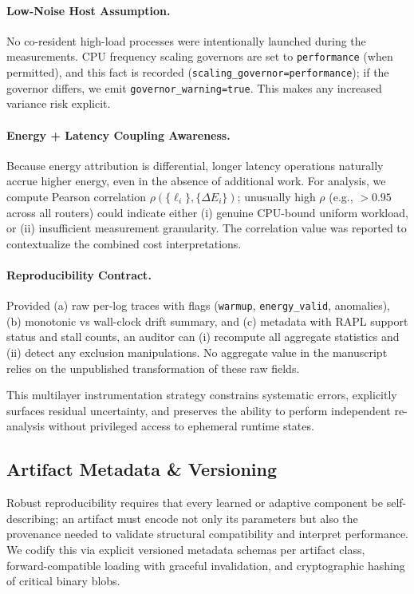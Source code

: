 \paragraph{Low-Noise Host Assumption.} No co-resident high-load processes were intentionally launched during the measurements. CPU frequency scaling governors are set to \texttt{performance} (when permitted), and this fact is recorded (\texttt{scaling\_governor=performance}); if the governor differs, we emit \texttt{governor\_warning=true}. This makes any increased variance risk explicit.

\paragraph{Energy + Latency Coupling Awareness.} Because energy attribution is differential, longer latency operations naturally accrue higher energy, even in the absence of additional work. For analysis, we compute Pearson correlation $\rho(\{\ell_i\}, \{\Delta E_i\})$; unusually high $\rho$ (e.g., $>0.95$ across all routers) could indicate either (i) genuine CPU-bound uniform workload, or (ii) insufficient measurement granularity. The correlation value was reported to contextualize the combined cost interpretations.

\paragraph{Reproducibility Contract.} Provided (a) raw per-log traces with flags (\texttt{warmup}, \texttt{energy\_valid}, anomalies), (b) monotonic vs wall-clock drift summary, and (c) metadata with RAPL support status and stall counts, an auditor can (i) recompute all aggregate statistics and (ii) detect any exclusion manipulations. No aggregate value in the manuscript relies on the unpublished transformation of these raw fields.

This multilayer instrumentation strategy constrains systematic errors, explicitly surfaces residual uncertainty, and preserves the ability to perform independent re-analysis without privileged access to ephemeral runtime states.
\subsection{Artifact Metadata \& Versioning}
\label{subsec:artifact_metadata_versioning}
Robust reproducibility requires that every learned or adaptive component be self-describing; an artifact must encode not only its parameters but also the provenance needed to validate structural compatibility and interpret performance. We codify this via explicit versioned metadata schemas per artifact class, forward-compatible loading with graceful invalidation, and cryptographic hashing of critical binary blobs.

